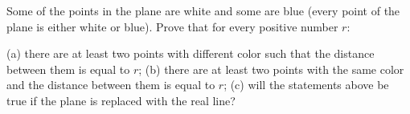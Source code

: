 Some of the points in the plane are white and some are blue (every point of the plane is either white or blue). Prove that for every positive number $r$:

(a) there are at least two points with different color such that the distance between them is equal to $r$;
(b) there are at least two points with the same color and the distance between them is equal to $r$;
(c) will the statements above be true if the plane is replaced with the real line?